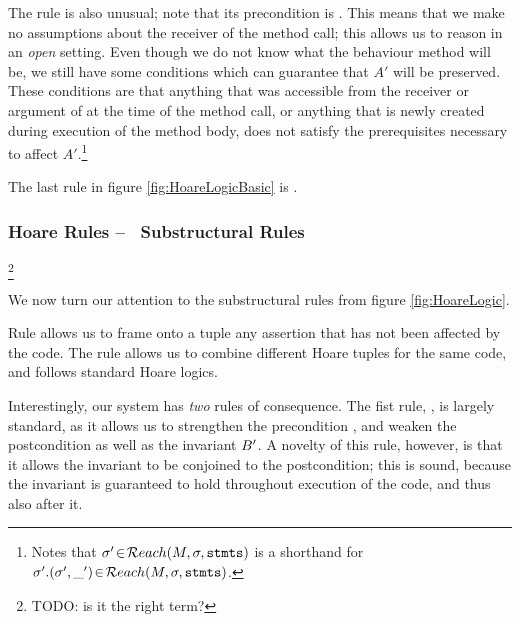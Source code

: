 \HoareFigTwo

The rule   is also unusual; note that its precondition is . This means that we make no assumptions about the receiver of the method call; this allows us to reason in an {\em open} setting.  Even though we do not know what the behaviour method  will be, we still have some conditions which can guarantee  that $A'$ will be preserved. These conditions are that anything that was accessible from the receiver  or argument of  at the time of the method call, or anything that is newly created during execution of the method body,  does not satisfy the prerequisites necessary to affect $A'$.\footnote{Notes that  $\sigma'\!\in\!{\mathcal{R}each}(M,\sigma,{{\textrm{\ttfamily{stmts}}}})$ is a shorthand for $\sigma'.  (\sigma',\_')\!\in\!{\mathcal{R}each}(M,\sigma,{{\textrm{\ttfamily{stmts}}}})$. }

 The last rule in figure \ref{fig:HoareLogicBasic} is  . 




\subsubsection{Hoare Rules -- ~Substructural Rules}\footnote{TODO: is it the right term?}

We now turn our attention to the substructural  rules from figure   \ref{fig:HoareLogic}.

Rule   allows us to frame onto a tuple any assertion that has not been affected by the code.
The rule   allows us to combine different Hoare tuples for the same code, and follows standard Hoare logics.

 Interestingly, our system has {\em two} rules of consequence. The fist rule, , is largely standard, as it allows us to strengthen the precondition \A, and weaken the postcondition \B as well as the invariant $B'$. A novelty of this rule, however, is that it allows the invariant to be conjoined to the postcondition; this is sound, because the invariant is guaranteed to hold throughout execution of the code, and thus also after it.

